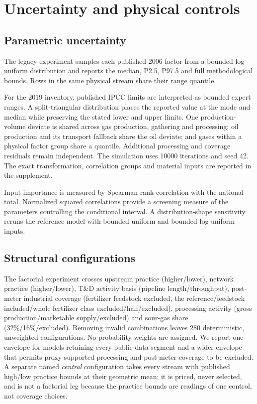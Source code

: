 \section{Uncertainty and physical controls}
\label{sec:uncertainty-controls}

\subsection{Parametric uncertainty}

The legacy experiment samples each published 2006 factor from a bounded log-uniform
distribution and reports the median, P2.5, P97.5 and full methodological bounds. Rows in the
same physical stream share their range quantile.

For the 2019 inventory, published IPCC limits are interpreted as bounded expert ranges. A
split-triangular distribution places the reported value at the mode and median while preserving
the stated lower and upper limits. One production-volume deviate is shared across gas
production, gathering and processing; oil production and its transport fallback share the oil
deviate; and gases within a physical factor group share a quantile. Additional processing and
coverage residuals remain independent. The simulation uses \num{10000} iterations and seed 42.
The exact transformation, correlation groups and material inputs are reported in the supplement.

Input importance is measured by Spearman rank correlation with the national total. Normalized
squared correlations provide a screening measure of the parameters controlling the conditional
interval. A distribution-shape sensitivity reruns the reference model with bounded uniform and
bounded log-uniform inputs.

\subsection{Structural configurations}

The factorial experiment crosses upstream practice (higher/lower), network practice
(higher/lower), T\&D activity basis (pipeline length/throughput), post-meter industrial coverage
(fertilizer feedstock excluded, the reference/feedstock included/whole fertilizer class
excluded/half/excluded), processing activity (gross
production/marketable supply/excluded) and
sour-gas share (32\%/16\%/excluded). Removing invalid combinations leaves 280 deterministic,
unweighted configurations. No probability weights are assigned. We report one envelope for
models retaining every public-data
segment and a wider envelope that permits proxy-supported processing and post-meter coverage to
be excluded. A separate named \emph{central} configuration takes every stream with published
high/low practice bounds at their geometric mean; it is priced, never selected, and is not a
factorial leg because the practice bounds are readings of one control, not coverage choices.

